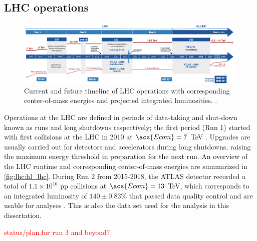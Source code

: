 \documentclass[../thesis.tex]{subfiles}
\begin{document}
\subsection{LHC operations}

\begin{figure}[!htb]
\begin{center}
\includegraphics[width=\linewidth]{fig/lhc_hl_lhc.png}
\caption[Current and future timeline of LHC operations as of 2025 with corresponding center-of-mass energies and projected integrated luminosities.]{\label{fig:lhc:hl_lhc}Current and future timeline of \acs{LHC} operations with corresponding center-of-mass energies and projected integrated luminosities. \citep{lhc:hl_lhc}.}
\end{center}
\end{figure}

Operations at the \acs{LHC} are defined in periods of data-taking and shut-down known as runs and long shutdowns respectively; the first period (Run 1) started with first collisions at the \acs{LHC} in 2010 at $\acs{Ecom}=7$ TeV \citep{PERF-2010-01}. Upgrades are usually carried out for detectors and accelerators during long shutdowns, raising the maximum energy threshold in preparation for the next run. An overview of the \acs{LHC} runtime and corresponding center-of-mass energies are summarized in \autoref{fig:lhc:hl_lhc}. During Run 2 from 2015-2018, the \acs{ATLAS} detector recorded a total of $1.1\times 10^{16}$ \acs{pp} collisions at $\acs{Ecom}=13$ TeV, which corresponds to an integrated luminosity of $140 \pm 0.83\%$ \fb that passed data quality control and are usable for analyses \citep{DAPR-2021-01}. This is also the data set used for the analysis in this dissertation.

\textcolor{red}{status/plan for run 3 and beyond?}
\end{document}
